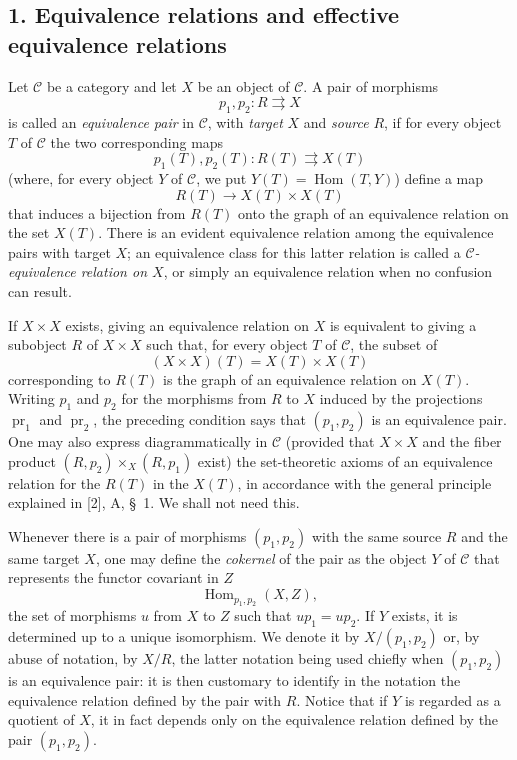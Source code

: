 \subsection*{1. Equivalence relations and effective equivalence relations}

Let $\mathcal C$ be a category and let $X$ be an object of $\mathcal C$. A
pair of morphisms
\[
  p_1,p_2:R\rightrightarrows X
\]
is called an \emph{equivalence pair} in $\mathcal C$, with \emph{target} $X$
and \emph{source} $R$, if for every object $T$ of $\mathcal C$ the two
corresponding maps
\[
  p_1(T),p_2(T):R(T)\rightrightarrows X(T)
\]
(where, for every object $Y$ of $\mathcal C$, we put
$Y(T)=\operatorname{Hom}(T,Y)$) define a map
\[
  R(T)\longrightarrow X(T)\times X(T)
\]
that induces a bijection from $R(T)$ onto the graph of an equivalence relation
on the set $X(T)$. There is an evident equivalence relation among the
equivalence pairs with target $X$; an equivalence class for this latter
relation is called a \emph{$\mathcal C$-equivalence relation on $X$}, or
simply an equivalence relation when no confusion can result.

If $X\times X$ exists, giving an equivalence relation on $X$ is equivalent to
giving a subobject $R$ of $X\times X$ such that, for every object $T$ of
$\mathcal C$, the subset of
\[
  (X\times X)(T)=X(T)\times X(T)
\]
corresponding to $R(T)$ is the graph of an equivalence relation on $X(T)$.
Writing $p_1$ and $p_2$ for the morphisms from $R$ to $X$ induced by the
projections $\operatorname{pr}_1$ and $\operatorname{pr}_2$, the preceding
condition says that $(p_1,p_2)$ is an equivalence pair. One may also express
diagrammatically in $\mathcal C$ (provided that $X\times X$ and the fiber
product $(R,p_2)\times_X(R,p_1)$ exist) the set-theoretic axioms of an
equivalence relation for the $R(T)$ in the $X(T)$, in accordance with the
general principle explained in [2], A, \S~1. We shall not need this.

Whenever there is a pair of morphisms $(p_1,p_2)$ with the same source $R$ and
the same target $X$, one may define the \emph{cokernel} of the pair as the
object $Y$ of $\mathcal C$ that represents the functor covariant in $Z$
\[
  \operatorname{Hom}_{p_1,p_2}(X,Z),
\]
the set of morphisms $u$ from $X$ to $Z$ such that $up_1=up_2$. If $Y$
exists, it is determined up to a unique isomorphism. We denote it by
$X/(p_1,p_2)$ or, by abuse of notation, by $X/R$, the latter notation being
used chiefly when
$(p_1,p_2)$ is an equivalence pair: it is then customary to identify
in the notation the equivalence relation defined by the pair with $R$. Notice
that if $Y$ is regarded as a quotient of $X$, it in fact depends only on the
equivalence relation defined by the pair $(p_1,p_2)$.

